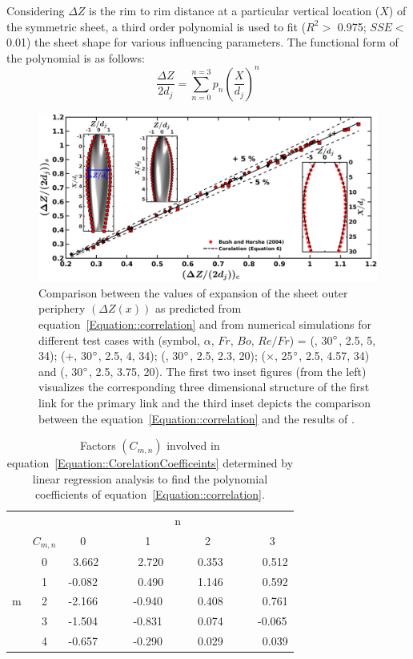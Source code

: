 \documentclass[%
 aip,
 sd,%
amsmath,amssymb,
preprint,%
author-year,%
]{revtex4-1}
\begin{document}
Considering $\Delta Z$ is the rim to rim distance at a particular vertical location ($X$) of the symmetric sheet, a third order polynomial is used to fit ($R^2 >$ 0.975; $SSE <$ 0.01) the sheet shape for various influencing parameters. The functional form of the polynomial is as follows: 
\begin{equation}\label{Equation::correlation}
\frac{\Delta Z}{2d_j} = \sum_{n = 0}^{n = 3}p_n\left(\frac{X}{d_j}\right)^n
\end{equation}
\begin{figure}
	\centering
	\includegraphics[width=\linewidth]{Figure9}
	\caption{Comparison between the values of expansion of the sheet outer periphery $\left(\Delta Z(x)\right)$ as predicted from equation~\ref{Equation::correlation} and from numerical simulations for different test cases with (symbol, $\alpha$, $Fr$, $Bo$, $Re/Fr$) = (\protect\MarkerSquareRed, 30$\degree$, 2.5, 5, 34); (+, 30$\degree$, 2.5, 4, 34); (\protect \MarkerDiamondBlack, 30$\degree$, 2.5, 2.3, 20); ($\times$, 25$\degree$, 2.5, 4.57, 34) and (\protect \MarkerCircleRed, 30$\degree$, 2.5, 3.75, 20). The first two inset figures (from the left) visualizes the corresponding three dimensional structure of the first link for the primary link and the third inset depicts the comparison between the equation~\ref{Equation::correlation} and the results of \cite{bush2004collision}.}
	\label{Figure::polyfit}
\end{figure}
\begin{table}
	\centering
	\caption{Factors $\left(C_{m,n}\right)$ involved in equation~\ref{Equation::CorelationCoefficeints} determined by linear regression analysis to find the polynomial coefficients of equation~\ref{Equation::correlation}.}
	\label{Table::polyfit}
	\begin{tabular}{@{}cc|ccccccccc@{}}
		&   &     &   & & &n &      &    &   &        \\
		& $C_{m,n}$  & 0 &   &  & 1 &      & 2 & &   & 3      \\\hline
		& 0 & ~3.662&  & & ~2.720&  & ~0.353& & & ~0.512  \\
		& 1  & -0.082 &&  & ~0.490  & & ~1.146& & & ~0.592  \\
		m& 2 & -2.166 & & & -0.940& & ~0.408& & & ~0.761  \\
		& 3 & -1.504& & & -0.831& & ~0.074& & & -0.065 \\
		& 4 & -0.657& & & -0.290& & ~0.029&& & ~0.039  \\ 
	\end{tabular}
\end{table}
\end{document}
